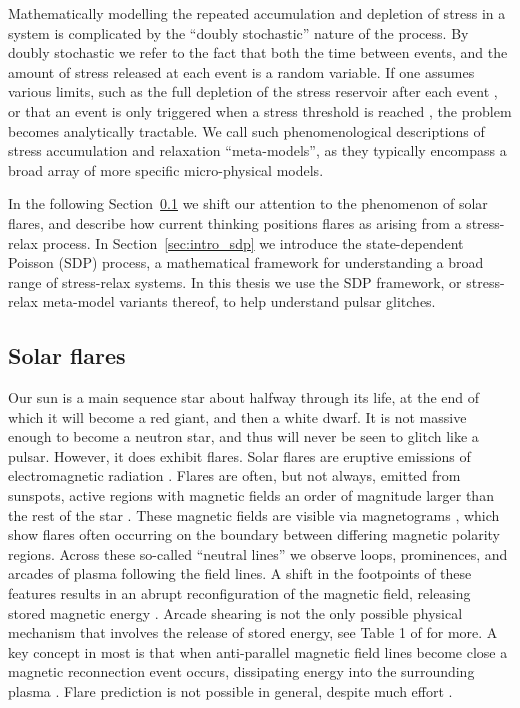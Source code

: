 Mathematically modelling the repeated accumulation and depletion of stress in a system is complicated by the ``doubly stochastic'' nature of the process. By doubly stochastic we refer to the fact that both the time between events, and the amount of stress released at each event is a random variable. If one assumes various limits, such as the full depletion of the stress reservoir after each event \citep{Daly2006}, or that an event is only triggered when a stress threshold is reached \citep{Daly2007}, the problem becomes analytically tractable. We call such phenomenological descriptions of stress accumulation and relaxation ``meta-models'', as they typically encompass a broad array of more specific micro-physical models.

In the following Section~\ref{sec:intro_sf} we shift our attention to the phenomenon of solar flares, and describe how current thinking positions flares as arising from a stress-relax process. In Section~\ref{sec:intro_sdp} we introduce the state-dependent Poisson (SDP) process, a mathematical framework for understanding a broad range of stress-relax systems. In this thesis we use the SDP framework, or stress-relax meta-model variants thereof, to help understand pulsar glitches.

\subsection{Solar flares}\label{sec:intro_sf}
Our sun is a main sequence star about halfway through its life, at the end of which it will become a red giant, and then a white dwarf. It is not massive enough to become a neutron star, and thus will never be seen to glitch like a pulsar. However, it does exhibit flares. Solar flares are eruptive emissions of electromagnetic radiation \citep{Fletcher2011,Benz2016}. Flares are often, but not always, emitted from sunspots, active regions with magnetic fields an order of magnitude larger than the rest of the star \citep{Solanki2003}. These magnetic fields are visible via magnetograms \citep{Hale1908}, which show flares often occurring on the boundary between differing magnetic polarity regions. Across these so-called ``neutral lines'' we observe loops, prominences, and arcades of plasma following the field lines. A shift in the footpoints of these features results in an abrupt reconfiguration of the magnetic field, releasing stored magnetic energy \citep{Fletcher2011}. Arcade shearing is not the only possible physical mechanism that involves the release of stored energy, see Table 1 of \citet{Green2018} for more. A key concept in most is that when anti-parallel magnetic field lines become close a magnetic reconnection event occurs, dissipating energy into the surrounding plasma \citep{Anzer1982}. Flare prediction is not possible in general, despite much effort \citep{Wheatland2004,Qahwaji2007,Mason2010,Bobra2015,Barnes2016,Camporeale2019,Thibeault2022}. 

